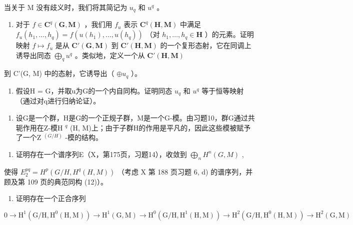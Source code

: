当关于 M 没有歧义时，我们将其简记为 \(u_q\) 和 \(u^q\) 。

\begin{enumerate}
\def\labelenumi{\alph{enumi})}
\tightlist
\item
  对于 \(f \in \mathbf{C}^q(\mathbf{G}, \mathbf{M})\) ，我们用 \(f_u\) 表示 \(\mathbf{C}^q(\mathbf{H}, \mathbf{M})\) 中满足 \(f_u(h_1, \ldots, h_q) = f(u(h_1), \ldots, u(h_q))\) （对 \(h_1, \ldots, h_q \in \mathbf{H}\) ）的元素。证明映射 \(f \mapsto f_u\) 是从 \(\mathbf{C}'(\mathbf{G}, \mathbf{M})\) 到 \(\mathbf{C}'(\mathbf{H}, \mathbf{M})\) 的一个复形态射，它在同调上诱导出同态 \(\bigoplus_{q} u^q\) 。类似地，定义一个从 \(\mathbf{C}'(\mathbf{H}, \mathbf{M})\)
\end{enumerate}

到 C'(G, M) 中的态射，它诱导出（ \(\oplus u_{q}\) ）。

\begin{enumerate}
\def\labelenumi{\alph{enumi})}
\setcounter{enumi}{1}
\tightlist
\item
  假设H = G，并取u为G的一个内自同构。证明同态 \(u_{q}\) 和 \(u^{q}\) 等于恒等映射（通过对q进行归纳论证）。
\end{enumerate}

\begin{enumerate}
\def\labelenumi{\arabic{enumi})}
\setcounter{enumi}{10}
\tightlist
\item
  设G是一个群，H是G的一个正规子群，M是一个G-模。由习题10，群G通过共轭作用在Z-模H \(^{q}\) (H, M)上；由于子群H的作用是平凡的，因此这些模被赋予了一个Z \(^{(G/H)}\) -模的结构。
\end{enumerate}

\begin{enumerate}
\def\labelenumi{\alph{enumi})}
\tightlist
\item
  证明存在一个谱序列E（X，第175页，习题14），收敛到 \(\bigoplus_{n} H^{n}(G, M)\) ,
\end{enumerate}

使得 \(E_{2}^{pq} = H^{p}(G/H, H^{q}(H, M))\) （考虑 X 第 188 页习题 6, d) 的谱序列，并顾及第 109 页的典范同构 (12)）。

\begin{enumerate}
\def\labelenumi{\alph{enumi})}
\setcounter{enumi}{1}
\tightlist
\item
  证明存在一个正合序列
\end{enumerate}

\[
0 \to \mathrm{H} ^ {1} (\mathrm{G} / \mathrm{H}, \mathrm{H} ^ {0} (\mathrm{H}, \mathrm{M})) \to \mathrm{H} ^ {1} (\mathrm{G}, \mathrm{M}) \to \mathrm{H} ^ {0} (\mathrm{G} / \mathrm{H}, \mathrm{H} ^ {1} (\mathrm{H}, \mathrm{M})) \to \mathrm{H} ^ {2} (\mathrm{G} / \mathrm{H}, \mathrm{H} ^ {0} (\mathrm{H}, \mathrm{M})) \to \mathrm{H} ^ {2} (\mathrm{G}, \mathrm{M})
\]

